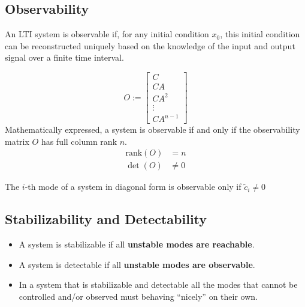 
\subsection{Observability}

An LTI system is observable if, for any initial condition $x_0$, this initial condition can be reconstructed uniquely based on the knowledge of the input and output signal over a finite time interval.

\begin{equation*}
    O:= \begin{bmatrix}
        C      \\
        CA     \\
        CA^2   \\
        \vdots \\
        CA^{n-1}
    \end{bmatrix}
\end{equation*}
Mathematically expressed, a system is observable if and only if the observability matrix $O$ has full column rank $n$.
\begin{align*}
    \text{rank}(O) & = n    \\
    \det(O)        & \neq 0
\end{align*}


The $i$-th mode of a system in diagonal form is observable only if $\tilde{c}_i \neq 0$

\subsection{Stabilizability and Detectability}
\begin{itemize}
    \item A system is stabilizable if all \textbf{unstable modes are reachable}.
    \item A system is detectable if all \textbf{unstable modes are observable}.
    \item In a system that is stabilizable and detectable all the modes that cannot be controlled and/or observed must behaving ``nicely'' on their own.
\end{itemize}

